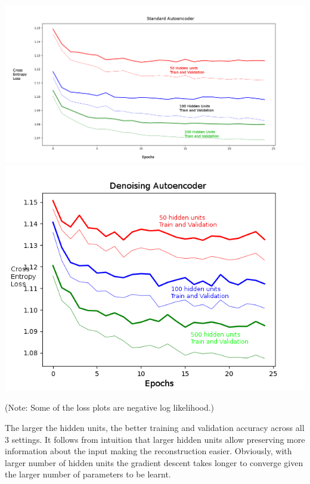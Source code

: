 \documentclass[10pt]{article}
\begin{document}
\includegraphics[scale=0.22]{ae_hu_experiment.png}
\includegraphics[scale=0.4]{ae_dropout_hu_experiment.png}

(Note: Some of the loss plots are negative log likelihood.)

The larger the hidden units, the better training and validation accuracy across all 3 settings. It follows from intuition that larger hidden units allow preserving more information about the input making the reconstruction easier. Obviously, with larger number of hidden units the gradient descent takes longer to converge given the larger number of parameters to be learnt.
\end{document}
